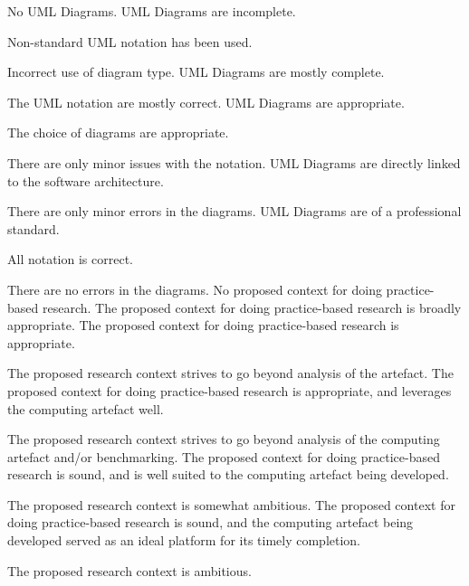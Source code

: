 \documentclass{../../fal_assignment}
\begin{document}
\begin{markingrubric}
%
	\grade\fail No UML Diagrams.
	\grade UML Diagrams are incomplete.
	\par Non-standard UML notation has been used.
	\par Incorrect use of diagram type.
	\grade UML Diagrams are mostly complete.
	\par The UML notation are mostly correct.
	\grade UML Diagrams are appropriate.
	\par The choice of diagrams are appropriate.
	\par There are only minor issues with the notation.
	\grade UML Diagrams are directly linked to the software architecture.
	\par There are only minor errors in the diagrams.
	\grade UML Diagrams are of a professional standard.
	\par All notation is correct.
	\par There are no errors in the diagrams.
%
        \grade\fail No proposed context for doing practice-based research.
        \grade The proposed context for doing practice-based research is broadly appropriate.
        \grade The proposed context for doing practice-based research is appropriate.
        \par The proposed research context strives to go beyond analysis of the artefact.
        \grade The proposed context for doing practice-based research is appropriate, and leverages the computing artefact well.
        \par The proposed research context strives to go beyond analysis of the computing artefact and/or benchmarking.
        \grade The proposed context for doing practice-based research is sound, and is well suited to the computing artefact being developed.
        \par The proposed research context is somewhat ambitious.
        \grade The proposed context for doing practice-based research is sound, and the computing artefact being developed served as an ideal platform for its timely completion. 
        \par The proposed research context is ambitious.
\end{markingrubric}
\end{document}
